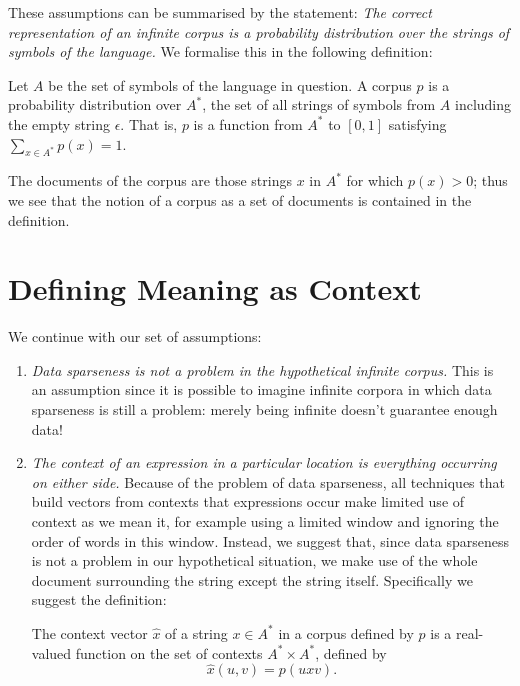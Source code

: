 \documentclass[12pt]{report}
\begin{document}
These assumptions can be summarised by the statement: \emph{The correct representation of an infinite corpus is a probability distribution over the strings of symbols of the language.}
We formalise this in the following definition:
\begin{defn}[Corpus]
Let $A$ be the set of symbols of the language in question. A corpus $p$ is a probability distribution over $A^*$, the set of all strings of symbols from $A$ including the empty string $\epsilon$. That is, $p$ is a function from $A^*$ to $[0,1]$ satisfying $\sum_{x\in A^*} p(x) = 1$.
\end{defn}
The documents of the corpus are those strings $x$ in $A^*$ for which $p(x) > 0$; thus we see that the notion of a corpus as a set of documents is contained in the definition.

\section{Defining Meaning as Context}

We continue with our set of assumptions:

\begin{enumerate}
\item \emph{Data sparseness is not a problem in the hypothetical infinite corpus.} This is an assumption since it is possible to imagine infinite corpora in which data sparseness is still a problem: merely being infinite doesn't guarantee enough data!

\item \emph{The context of an expression in a particular location is everything occurring on either side.} Because of the problem of data sparseness, all techniques that build vectors from contexts that expressions occur make limited use of context as we mean it, for example using a limited window and ignoring the order of words in this window. Instead, we suggest that, since data sparseness is not a problem in our hypothetical situation, we make use of the whole document surrounding the string except the string itself. Specifically we suggest the definition:
\begin{defn}
The context vector $\hat{x}$ of a string $x \in A^*$ in a corpus defined by $p$ is a real-valued function on the set of contexts $A^* \times A^*$, defined by
$$\hat{x}(u,v) = p(uxv).$$
\end{defn}
\end{enumerate}

 
\end{document}
